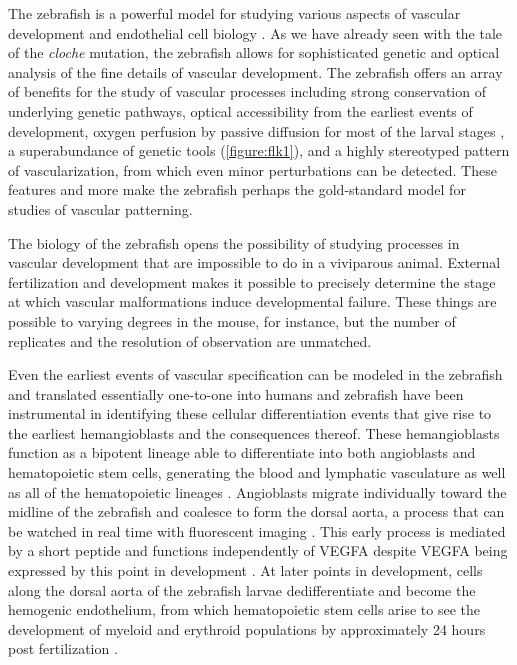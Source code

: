 The zebrafish is a powerful model for studying various aspects of vascular development and endothelial cell biology \citep{Wilkinson2014}. As we have already seen with the tale of the \textit{cloche} mutation, the zebrafish allows for sophisticated genetic and optical analysis of the fine details of vascular development. The zebrafish offers an array of benefits for the study of vascular processes including strong conservation of underlying genetic pathways, optical accessibility from the earliest events of development, oxygen perfusion by passive diffusion for most of the larval stages \citep{Ellertsdottir2010}, a superabundance of genetic tools (\autoref{figure:flk1}), and a highly stereotyped pattern of vascularization, from which even minor perturbations can be detected. These features and more make the zebrafish perhaps the gold-standard model for studies of vascular patterning.

The biology of the zebrafish opens the possibility of studying processes in vascular development that are impossible to do in a viviparous animal. External fertilization and development makes it possible to precisely determine the stage at which vascular malformations induce developmental failure. These things are possible to varying degrees in the mouse, for instance, but the number of replicates and the resolution of observation are unmatched. 

Even the earliest events of vascular specification can be modeled in the zebrafish and translated essentially one-to-one into humans and zebrafish have been instrumental in identifying these cellular differentiation events that give rise to the earliest hemangioblasts and the consequences thereof. These hemangioblasts function as a bipotent lineage able to differentiate into both angioblasts and hematopoietic stem cells, generating the blood and lymphatic vasculature as well as all of the hematopoietic lineages \citep{Vogeli2006}. Angioblasts migrate individually toward the midline of the zebrafish and coalesce to form the dorsal aorta, a process that can be watched in real time with fluorescent imaging \citep{Lawson2002}. This early process is mediated by a short peptide and functions independently of VEGFA despite VEGFA being expressed by this point in development \citep{Nasevicius2000, Liang2001, Hogan2017}. At later points in development, cells along the dorsal aorta of the zebrafish larvae dedifferentiate and become the hemogenic endothelium, from which hematopoietic stem cells arise to see the development of myeloid and erythroid populations by approximately 24 hours post fertilization \citep{Gore2012}.  

